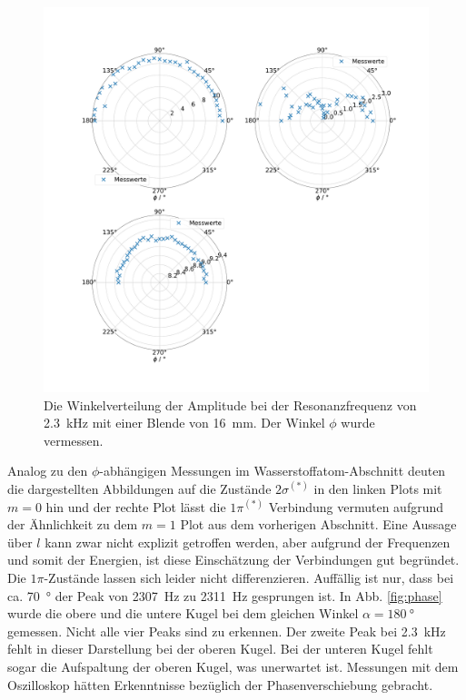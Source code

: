\begin{figure}
    \centering
    \includegraphics[width=\textwidth]{plots/D_3.pdf}
    \caption{Die Winkelverteilung der Amplitude bei der Resonanzfrequenz von \SI{2.3}{\kilo\hertz} mit einer Blende von \SI{16}{\milli\metre}. Der Winkel $\phi$ wurde vermessen.}
    \label{fig:polar_molekuel}
\end{figure}

Analog zu den $\phi$-abhängigen Messungen im Wasserstoffatom-Abschnitt deuten die dargestellten Abbildungen auf die Zustände $2 \sigma^{(*)}$ in den linken Plots mit $m = 0$ hin und der rechte Plot lässt die $1 \pi^{(*)}$ Verbindung vermuten aufgrund der Ähnlichkeit zu dem $m=1$ Plot aus dem vorherigen Abschnitt. Eine Aussage über $l$ kann zwar nicht explizit getroffen werden, aber aufgrund der Frequenzen und somit der Energien, ist diese Einschätzung der Verbindungen gut begründet. Die $1 \pi$-Zustände lassen sich leider nicht differenzieren. Auffällig ist nur, dass bei ca. \SI{70}{\degree} der Peak von \SI{2307}{\hertz} zu \SI{2311}{\hertz} gesprungen ist. 
In Abb. \ref{fig:phase} wurde die obere und die untere Kugel bei dem gleichen Winkel $\alpha=\SI{180}{\degree}$ gemessen. 
Nicht alle vier Peaks sind zu erkennen. Der zweite Peak bei \SI{2.3}{\kilo\hertz} fehlt in dieser Darstellung bei der oberen Kugel. Bei der unteren Kugel fehlt sogar die Aufspaltung der oberen Kugel, was unerwartet ist. Messungen mit dem Oszilloskop hätten Erkenntnisse bezüglich der Phasenverschiebung gebracht. 


